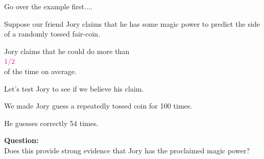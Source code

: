 \begin{frame}[fragile]
 \begin{center}
 \begin{minipage}{0.6\textwidth}
 \begin{center}
Go over the example first....
\end{center}
 \end{minipage}
\end{center}
\end{frame}
\begin{frame}[fragile]
 \begin{center}
 \begin{minipage}{0.6\textwidth}
 \begin{center}
    Suppose our friend Jory claims that he has some magic power to predict the side of a randomly tossed fair-coin.
    \bigskip

    Jory claims that he could do more than\\ $\textcolor{magenta}{1/2}$ \\ of the time on average.
    \bigskip

    Let's test Jory to see if we believe his claim.
\end{center}
 \end{minipage}
\end{center}
\end{frame}
\begin{frame}[fragile]
 \begin{center}
 \begin{minipage}{0.6\textwidth}
 \begin{center}
    We made Jory guess a repeatedly tossed coin for 100 times.
    \bigskip

    He guesses correctly 54 times.
    \bigskip
    \bigskip

    {\bf  Question: }\\

    Does this provide strong evidence that Jory has the proclaimed magic power?
\end{center}
 \end{minipage}
\end{center}
\end{frame}
